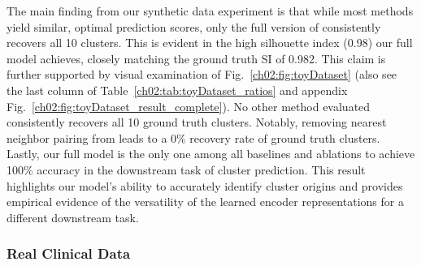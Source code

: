 The main finding from our synthetic data experiment is that while most methods yield similar, optimal prediction scores, only the full version of  consistently recovers all 10 clusters.
This is evident in the high silhouette index (0.98) our full model achieves, closely matching the ground truth SI of 0.982. %
This claim is further supported by visual examination of Fig.~\ref{ch02:fig:toyDataset} (also see the last column of Table~\ref{ch02:tab:toyDataset_ratios} and appendix Fig.~\ref{ch02:fig:toyDataset_result_complete}).
No other method evaluated consistently recovers all 10 ground truth clusters.
Notably, removing nearest neighbor pairing from  leads to a 0\% recovery rate of ground truth clusters. 
Lastly, our full model is the only one among all baselines and ablations to achieve 100\% accuracy in the downstream task of cluster prediction.
This result highlights our model's ability to accurately identify cluster origins and provides empirical evidence of the versatility of the learned encoder representations for a different downstream task.


   
\subsubsection{Real Clinical Data}
\label{ch02:sec:ClinicalExperiments}







